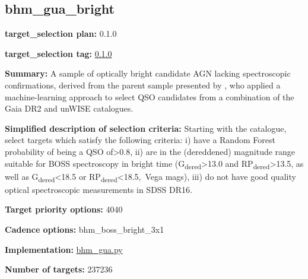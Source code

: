\hypertarget{bhm_gua_bright_plan0.1.0}{%
\subsection{bhm\_gua\_bright}\label{bhm_gua_bright_plan0.1.0}}

\noindent\textbf{target\_selection plan:} 0.1.0

\noindent\textbf{target\_selection tag:}
\href{https://github.com/sdss/target_selection/tree/0.1.0/}{0.1.0}

\noindent\textbf{Summary:} A sample of optically bright candidate AGN lacking
spectroscopic confirmations, derived from the parent sample presented by
\citet{Shu2019}, who applied a machine-learning approach to select QSO
candidates from a combination of the Gaia DR2 and unWISE catalogues.

\noindent\textbf{Simplified description of selection criteria:} Starting with the
\citet{Shu2019} catalogue, select targets which satisfy the following
criteria: i) have a Random Forest probability of being a QSO
of\textgreater0.8, ii) are in the (dereddened) magnitude range suitable
for BOSS spectroscopy in bright time
(G\textsubscript{dered}\textgreater13.0 and
RP\textsubscript{dered}\textgreater13.5, as well as
G\textsubscript{dered}\textless18.5 or
RP\textsubscript{dered}\textless18.5,~Vega mags), iii) do not have good
quality optical spectroscopic measurements in SDSS DR16.


\noindent\textbf{Target priority options:} 4040

\noindent\textbf{Cadence options:} bhm\_boss\_bright\_3x1

\noindent\textbf{Implementation:}
\href{https://github.com/sdss/target_selection/blob/0.1.0/python/target_selection/cartons/bhm_gua.py}{bhm\_gua.py}

\noindent\textbf{Number of targets:} 237236
